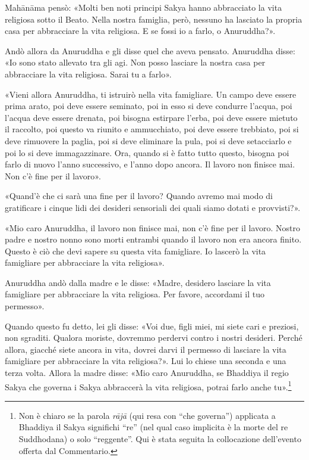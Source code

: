 Mahānāma pensò: «Molti ben noti principi Sakya hanno abbracciato la vita
religiosa sotto il Beato. Nella nostra famiglia, però, nessuno ha lasciato la
propria casa per abbracciare la vita religiosa. E se fossi io a farlo, o
Anuruddha?».

Andò allora da Anuruddha e gli disse quel che aveva pensato. Anuruddha disse:
«Io sono stato allevato tra gli agi. Non posso lasciare la nostra casa per
abbracciare la vita religiosa. Sarai tu a farlo».

«Vieni allora Anuruddha, ti istruirò nella vita famigliare. Un campo deve essere
prima arato, poi deve essere seminato, poi in esso si deve condurre l’acqua, poi
l’acqua deve essere drenata, poi bisogna estirpare l’erba, poi deve essere
mietuto il raccolto, poi questo va riunito e ammucchiato, poi deve essere
trebbiato, poi si deve rimuovere la paglia, poi si deve eliminare la pula, poi
si deve setacciarlo e poi lo si deve immagazzinare. Ora, quando si è fatto tutto
questo, bisogna poi farlo di nuovo l’anno successivo, e l’anno dopo ancora. Il
lavoro non finisce mai. Non c’è fine per il lavoro».

«Quand’è che ci sarà una fine per il lavoro? Quando avremo mai modo di
gratificare i cinque lidi dei desideri sensoriali dei quali siamo dotati e
provvisti?».

«Mio caro Anuruddha, il lavoro non finisce mai, non c’è fine per il lavoro.
Nostro padre e nostro nonno sono morti entrambi quando il lavoro non era ancora
finito. Questo è ciò che devi sapere su questa vita famigliare. Io lascerò la
vita famigliare per abbracciare la vita religiosa».

Anuruddha andò dalla madre e le disse: «Madre, desidero lasciare la vita
famigliare per abbracciare la vita religiosa. Per favore, accordami il tuo
permesso».

Quando questo fu detto, lei gli disse: «Voi due, figli miei, mi siete cari e
preziosi, non sgraditi. Qualora moriste, dovremmo perdervi contro i nostri
desideri. Perché allora, giacché siete ancora in vita, dovrei darvi il permesso
di lasciare la vita famigliare per abbracciare la vita religiosa?». Lui lo
chiese una seconda e una terza volta. Allora la madre disse: «Mio caro
Anuruddha, se Bhaddiya il regio Sakya che governa i Sakya abbraccerà la vita
religiosa, potrai farlo anche tu».\footnote{Non è chiaro se la parola
  \emph{rājā} (qui resa con “che governa”) applicata a Bhaddiya il Sakya
  significhi “re” (nel qual caso implicita è la morte del re Suddhodana) o solo
  “reggente”. Qui è stata seguita la collocazione dell’evento offerta dal
  Commentario.}

